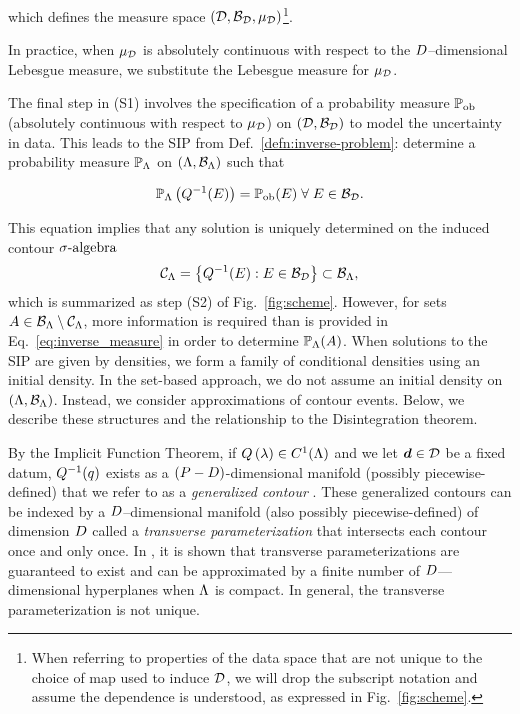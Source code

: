 \noindent which defines the measure space $(\mathcal{D}, \mathcal{B}_{\mathcal{D}}, \mu_{\mathcal{D}})$\footnote{When referring to properties of the data space that are not unique to the choice of map used to induce $\mathcal{D}$, we will drop the subscript notation and assume the dependence is understood, as expressed in Fig.~\ref{fig:scheme}.}.

In practice, when $\mu_{\mathcal{D}}$ is absolutely continuous with respect to the $D$--dimensional Lebesgue measure, we substitute the Lebesgue measure for $\mu_{\mathcal{D}}$.

The final step in (S1) involves the specification of a probability measure $\operatorname*{\mathbb{P}_{ob}}$ (absolutely continuous with respect to $\mu_{\mathcal{D}}$) on ${(\mathcal{D}, \mathcal{B}_{\mathcal{D}})}$ to model the uncertainty in data.
This leads to the SIP from Def.~\eqref{defn:inverse-problem}: determine a probability measure $\mathbb{P}_{\Lambda}$ on ${({\Lambda}, \mathcal{B}_{{\Lambda}})}$ such that

\begin{equation}\label{eq:inverse_measure}
\mathbb{P}_{\Lambda} \left ( Q^{-1}(E)\right ) = \operatorname*{\mathbb{P}_{ob}}(E) \; \forall \; E \in \mathcal{B}_{\mathcal{D}}.
\end{equation}

This equation implies that any solution is uniquely determined on the induced contour $\sigma\text{-algebra}$
\begin{equation}\label{eq:contour_sa}
\mathcal{C}_{{\Lambda}} = \left\{Q^{-1}(E) : E \in \mathcal{B}_{\mathcal{D}} \right\} \subset \mathcal{B}_{{\Lambda}},
\end{equation}
which is summarized as step (S2) of Fig.~\ref{fig:scheme}.
However, for sets $A \in \mathcal{B}_{{\Lambda}} \setminus \mathcal{C}_{{\Lambda}}$, more information is required than is provided in Eq.~\eqref{eq:inverse_measure} in order to determine $\mathbb{P}_{\Lambda} (A)$.
When solutions to the SIP are given by densities, we form a family of conditional densities using an initial density.
In the set-based approach, we do not assume an initial density on $({\Lambda}, \mathcal{B}_{{\Lambda}})$.
Instead, we consider approximations of contour events.
Below, we describe these structures and the relationship to the Disintegration theorem.

By the Implicit Function Theorem, if $Q\left ( \lambda \right ) \in C^1 ({\Lambda})$ and we let $\operatorname*{\boldsymbol{d}}\in\mathcal{D}$ be a fixed datum, $Q^{-1}(q)$ exists as a $(P-D)$\--dimensional manifold (possibly piecewise-defined) that we refer to as a \emph{generalized contour} \cite{BET+14}.
These generalized contours can be indexed by a $D$--dimensional manifold (also possibly piecewise-defined) of dimension $D$ called a \emph{transverse parameterization} that intersects each contour once and only once.
In \cite{BET+14}, it is shown that transverse parameterizations are guaranteed to exist and can be approximated by a finite number of $D$---dimensional hyperplanes when ${\Lambda}$ is compact.
In general, the transverse parameterization is not unique.

